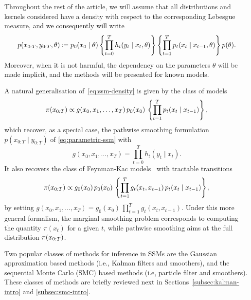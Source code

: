 Throughout the rest of the article, we will assume that all distributions and kernels considered have a density with respect to the corresponding Lebesgue measure, and we consequently will write
\begin{equation}
    \label{eq:ssm-density}
    p(x_{0:T}, y_{0:T}, \theta)
    \coloneqq p_0(x_0 \mid \theta) \left\{\prod_{t=0}^T h_t(y_t \mid x_t, \theta)\right\} \left\{\prod_{t=1}^T p_t(x_t \mid x_{t-1}, \theta) \right\} p(\theta).
\end{equation}
Moreover, when it is not harmful, the dependency on the parameters $\theta$ will be made implicit, and the methods will be presented for known models.

A natural generalisation of~\eqref{eq:ssm-density} is given by the class of models
\begin{equation}
    \label{eq:gen-ssm}
    \pi(x_{0:T})
    \propto g(x_0, x_1, \ldots, x_T) \, p_0(x_0)\, \left\{\prod_{t=1}^T p_t(x_t \mid x_{t-1}) \right\},
\end{equation}
which recover, as a special case, the pathwise smoothing formulation $p(x_{0:T} \mid y_{0:T})$ of \eqref{eq:parametric-ssm} with
\begin{equation}
    g(x_0, x_1, \ldots, x_T) = \prod_{t=0}^T h_t(y_t \mid x_t).
\end{equation}
It also recovers the class of Feynman-Kac models~\citep[see, e.g.,][]{DelMoral2004Book} with tractable transitions
\begin{equation}
    \label{eq:feynman-kac}
    \pi(x_{0:T})
    \propto g_0(x_0) \, p_0(x_0) \, \left\{\prod_{t=1}^T g_t(x_t, x_{t-1}) \, p_t(x_t \mid x_{t-1}) \right\},
\end{equation}
by setting $g(x_0, x_1, \ldots, x_T) = g_0(x_0) \, \prod_{t=1}^T g_t(x_t, x_{t-1})$.
Under this more general formalism, the marginal smoothing problem corresponds to computing the quantity $\pi(x_t)$ for a given $t$, while pathwise smoothing aims at the full distribution $\pi(x_{0:T})$.

Two popular classes of methods for inference in SSMs are the Gaussian approximation based methods (i.e., Kalman filters and smoothers), and the sequential Monte Carlo (SMC) based methods (i.e, particle filter and smoothers). These classes of methods are briefly reviewed next in Sections~\ref{subsec:kalman-intro} and \ref{subsec:smc-intro}.



